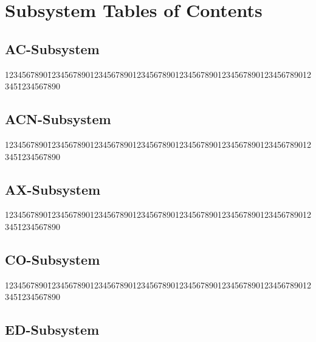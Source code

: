 \section{Subsystem Tables of Contents}

\subsection{AC-Subsystem}

{\small
\begin{tabbing}
1234567890\=12345678901234567890123456789012345678901234567890123456789012345\=1234567890 \kill



\end{tabbing}
}

\subsection{ACN-Subsystem}

{\small
\begin{tabbing}
1234567890\=12345678901234567890123456789012345678901234567890123456789012345\=1234567890 \kill



\end{tabbing}
}

\subsection{AX-Subsystem}
 
{\small
\begin{tabbing}
1234567890\=12345678901234567890123456789012345678901234567890123456789012345\=1234567890 \kill
 

 
\end{tabbing}
}

\subsection{CO-Subsystem}
 
{\small
\begin{tabbing}
1234567890\=12345678901234567890123456789012345678901234567890123456789012345\=1234567890 \kill
 

 
\end{tabbing}
}

\subsection{ED-Subsystem}
 
